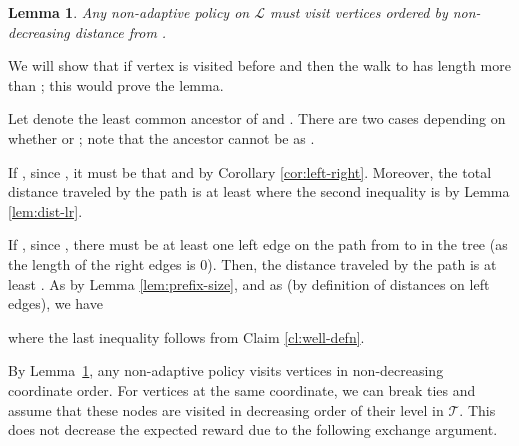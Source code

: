 \documentclass[11pt,letterpaper]{article}
\newtheorem{lemma}[theorem]{Lemma}
\numberwithin{algorithm}{section}
\newenvironment{proof}{

\noindent{\bf Proof:}}
{\hfill


}
\newcommand{\lm}[0]{{\ensuremath{\mathcal{L}}}\xspace}
\newcommand{\T}{\ensuremath{\mathcal{T}}\xspace}
\begin{document}
\begin{lemma}\label{lem:line-na-ordered}
Any non-adaptive policy on \lm must visit vertices ordered by non-decreasing distance from .
\end{lemma}
\begin{proof}
We will show that if vertex  is visited before  and  then the walk to  has length more than ; this would prove the lemma.

Let  denote the least common ancestor of  and .
There are two cases depending on whether  or ; note that the ancestor  cannot be  as .

If , since , it must be that  and  by Corollary \ref{cor:left-right}.
Moreover, the total distance traveled by the path is at least
  where the second inequality is  by Lemma \ref{lem:dist-lr}.


If , since , there must be at least one left edge  on the path from  to  in the tree (as the length of the right edges is 0).  Then,
the distance traveled by the path is at least . As  by Lemma \ref{lem:prefix-size},
 and as  (by definition of distances on left edges), we have
  
where the last inequality follows from Claim \ref{cl:well-defn}.
\end{proof}

By Lemma~\ref{lem:line-na-ordered}, any non-adaptive policy  visits vertices in non-decreasing coordinate order. For vertices at the same coordinate, we can break ties and assume that these nodes are visited in decreasing order of their level in \T. This does not decrease the expected reward due to the following exchange argument.

\def\oN{\ensuremath{\overline{\cal N}}\xspace}
\end{document}
